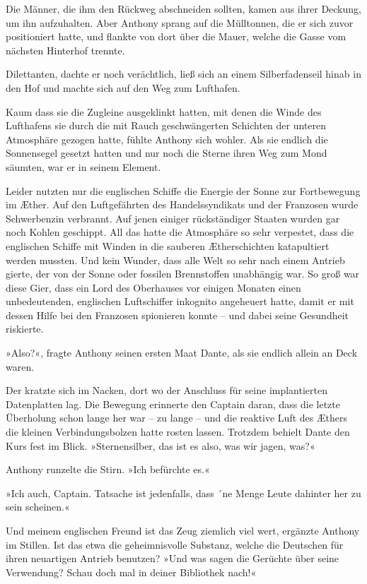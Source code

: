 Die Männer, die ihm den Rückweg abschneiden sollten, kamen aus
ihrer Deckung, um ihn aufzuhalten. Aber Anthony sprang auf die
Mülltonnen, die er sich zuvor positioniert hatte, und flankte von
dort über die Mauer, welche die Gasse vom nächsten Hinterhof
trennte.

Dilettanten, dachte er noch verächtlich, ließ sich an einem
Silberfadenseil hinab in den Hof und machte sich auf den Weg zum
Lufthafen.

\tb

Kaum dass sie die Zugleine ausgeklinkt hatten, mit denen die Winde
des Lufthafens sie durch die mit Rauch geschwängerten Schichten der
unteren Atmosphäre gezogen hatte, fühlte Anthony sich wohler. Als
sie endlich die Sonnensegel gesetzt hatten und nur noch die Sterne
ihren Weg zum Mond säumten, war er in seinem Element.

Leider nutzten nur die englischen Schiffe die Energie der Sonne zur
Fortbewegung im Æther. Auf den Luftgefährten des Handelssyndikats
und der Franzosen wurde Schwerbenzin verbrannt. Auf jenen einiger
rückständiger Staaten wurden gar noch Kohlen geschippt. All das
hatte die Atmosphäre so sehr verpestet, dass die englischen Schiffe
mit Winden in die sauberen Ætherschichten katapultiert werden
mussten. Und kein Wunder, dass alle Welt so sehr nach einem Antrieb
gierte, der von der Sonne oder fossilen Brennstoffen unabhängig
war. So groß war diese Gier, dass ein Lord des Oberhauses vor
einigen Monaten einen unbedeutenden, englischen Luftschiffer
inkognito angeheuert hatte, damit er mit dessen Hilfe bei den
Franzosen spionieren konnte – und dabei seine Gesundheit
riskierte.

»Also?«, fragte Anthony seinen ersten Maat Dante, als sie endlich
allein an Deck waren.

Der kratzte sich im Nacken, dort wo der Anschluss für seine
implantierten Datenplatten lag. Die Bewegung erinnerte den Captain
daran, dass die letzte Überholung schon lange her war – zu lange –
und die reaktive Luft des Æthers die kleinen Verbindungsbolzen
hatte rosten lassen. Trotzdem behielt Dante den Kurs fest im Blick.
»Sternensilber, das ist es also, was wir jagen, was?«

Anthony runzelte die Stirn. »Ich befürchte es.«

»Ich auch, Captain. Tatsache ist jedenfalls, dass ´ne Menge Leute
dahinter her zu sein scheinen.«

Und meinem englischen Freund ist das Zeug ziemlich viel wert,
ergänzte Anthony im Stillen. Ist das etwa die geheimnisvolle
Substanz, welche die Deutschen für ihren neuartigen Antrieb
benutzen? »Und was sagen die Gerüchte über seine Verwendung? Schau
doch mal in deiner Bibliothek nach!«

